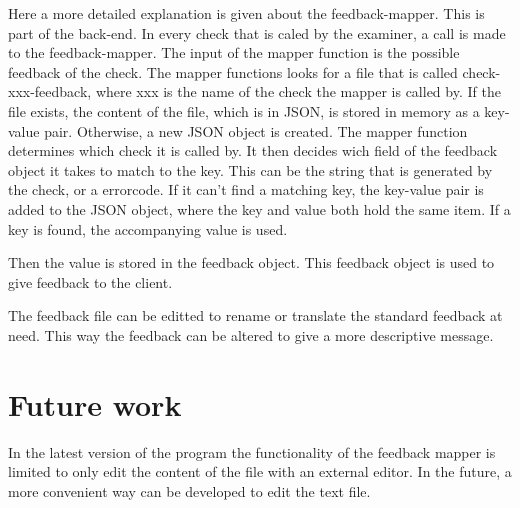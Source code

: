 Here a more detailed explanation is given about the feedback-mapper.
This is part of the back-end.
In every \gls{check} that is caled by the \gls{examiner}, a call is made to the feedback-mapper.
The input of the mapper function is the possible feedback of the \gls{check}.
The mapper functions looks for a file that is called check-xxx-feedback,
where xxx is the name of the \gls{check} the mapper is called by.
If the file exists, the content of the file, which is in JSON,
is stored in memory as a key-value pair.
Otherwise, a new JSON object is created.
The mapper function determines which \gls{check} it is called by.
It then decides wich field of the feedback object it takes to match to the key.
This can be the string that is generated by the \gls{check}, or a errorcode. 
If it can't find a matching key, the key-value pair is added to the JSON object,
where the key and value both hold the same item.
If a key is found, the accompanying value is used.


Then the value is stored in the feedback object.
This feedback object is used to give feedback to the client.

The feedback file can be editted to rename or translate the standard feedback at need.
This way the feedback can be altered to give a more descriptive message.

    
\section{Future work}
In the latest version of the program the functionality of the feedback
mapper is limited to only edit the content of the file with an external editor.
In the future,  a more convenient way can be developed to edit the text file.

